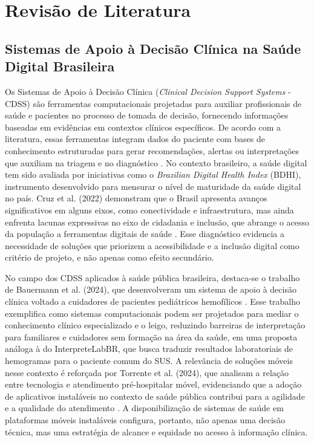 \documentclass[12pt]{article}
\begin{document}
\section{Revisão de Literatura}

\subsection{Sistemas de Apoio à Decisão Clínica na Saúde Digital Brasileira}

Os Sistemas de Apoio à Decisão Clínica (\emph{Clinical Decision Support Systems} - CDSS) são ferramentas computacionais projetadas para auxiliar profissionais de saúde e pacientes no processo de tomada de decisão, fornecendo informações baseadas em evidências em contextos clínicos específicos. De acordo com a literatura, essas ferramentas integram dados do paciente com bases de conhecimento estruturadas para gerar recomendações, alertas ou interpretações que auxiliam na triagem e no diagnóstico \cite{bauermann2024}. No contexto brasileiro, a saúde digital tem sido avaliada por iniciativas como o \emph{Brazilian Digital Health Index} (BDHI), instrumento desenvolvido para mensurar o nível de maturidade da saúde digital no país. Cruz et al. (2022) demonstram que o Brasil apresenta avanços significativos em alguns eixos, como conectividade e infraestrutura, mas ainda enfrenta lacunas expressivas no eixo de cidadania e inclusão, que abrange o acesso da população a ferramentas digitais de saúde \cite{cruz2022}. Esse diagnóstico evidencia a necessidade de soluções que priorizem a acessibilidade e a inclusão digital como critério de projeto, e não apenas como efeito secundário.

No campo dos CDSS aplicados à saúde pública brasileira, destaca-se o trabalho de Bauermann et al. (2024), que desenvolveram um sistema de apoio à decisão clínica voltado a cuidadores de pacientes pediátricos hemofílicos \cite{bauermann2024}. Esse trabalho exemplifica como sistemas computacionais podem ser projetados para mediar o conhecimento clínico especializado e o leigo, reduzindo barreiras de interpretação para familiares e cuidadores sem formação na área da saúde, em uma proposta análoga à do InterpreteLabBR, que busca traduzir resultados laboratoriais de hemogramas para o paciente comum do SUS. A relevância de soluções móveis nesse contexto é reforçada por Torrente et al. (2024), que analisam a relação entre tecnologia e atendimento pré-hospitalar móvel, evidenciando que a adoção de aplicativos instaláveis no contexto de saúde pública contribui para a agilidade e a qualidade do atendimento \cite{torrente2024}. A disponibilização de sistemas de saúde em plataformas móveis instaláveis configura, portanto, não apenas uma decisão técnica, mas uma estratégia de alcance e equidade no acesso à informação clínica.
\end{document}
